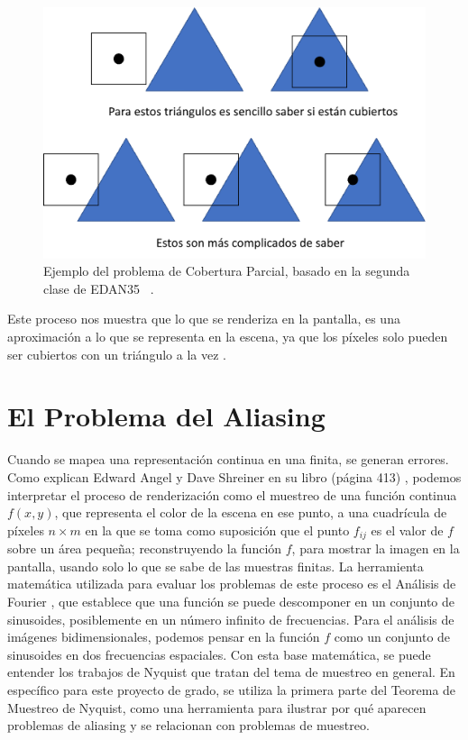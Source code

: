 \documentclass[pregrado]{tesis-usb} %
\begin{document}
\begin{figure}[!hbt]
	\centering
	\includegraphics[scale=0.5]{images/edge_testing.png} 
	\caption{Ejemplo del problema de Cobertura Parcial, basado en la segunda clase de EDAN35 ~\cite{Doggett2017EDAN35}. }\label{fig:partialcover}
\end{figure}

Este proceso nos muestra que lo que se renderiza en la pantalla, es una aproximación a lo que se representa en la escena, ya que los píxeles solo pueden ser cubiertos con un triángulo a la vez \cite{Moller2007, Doggett2017EDAN35}.


\section{El Problema del Aliasing}
Cuando se mapea una representación continua en una finita, se generan errores. Como explican Edward Angel y Dave Shreiner en su libro (página 413) \cite{Shreiner2011}, podemos interpretar el proceso de renderización como el muestreo de una función continua $f(x, y)$, que representa el color de la escena en ese punto, a una cuadrícula de píxeles $n\times m$ en la que se toma como suposición que el punto $f_{ij}$ es el valor de $f$ sobre un área pequeña; reconstruyendo la función $f$, para mostrar la imagen en la pantalla, usando solo lo que se sabe de las muestras finitas. La herramienta matemática utilizada para evaluar los problemas de este proceso es el Análisis de Fourier \cite{Shreiner2011}, que establece que una función se puede descomponer en un conjunto de sinusoides, posiblemente en un número infinito de frecuencias. Para el análisis de imágenes bidimensionales, podemos pensar en la función $f$ como un conjunto de sinusoides en dos frecuencias espaciales. Con esta base matemática, se puede entender los trabajos de Nyquist que tratan del tema de muestreo en general. En específico para este proyecto de grado, se utiliza la primera parte del Teorema de Muestreo de Nyquist, como una herramienta para ilustrar por qué aparecen problemas de aliasing y se relacionan con problemas de muestreo.  \\
\end{document}
